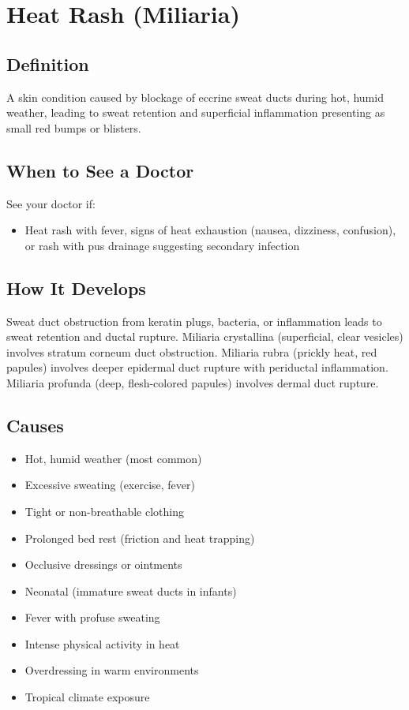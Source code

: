\chapter{Heat Rash (Miliaria)}

\section*{Definition}
A skin condition caused by blockage of eccrine sweat ducts during hot, humid weather, leading to sweat retention and superficial inflammation presenting as small red bumps or blisters.

\section*{When to See a Doctor}
See your doctor if:
\begin{itemize}
  \item Heat rash with fever, signs of heat exhaustion (nausea, dizziness, confusion), or rash with pus drainage suggesting secondary infection
\end{itemize}

\section*{How It Develops}
Sweat duct obstruction from keratin plugs, bacteria, or inflammation leads to sweat retention and ductal rupture. Miliaria crystallina (superficial, clear vesicles) involves stratum corneum duct obstruction. Miliaria rubra (prickly heat, red papules) involves deeper epidermal duct rupture with periductal inflammation. Miliaria profunda (deep, flesh-colored papules) involves dermal duct rupture.

\section*{Causes}
\begin{itemize}
  \item Hot, humid weather (most common)
  \item Excessive sweating (exercise, fever)
  \item Tight or non-breathable clothing
  \item Prolonged bed rest (friction and heat trapping)
  \item Occlusive dressings or ointments
  \item Neonatal (immature sweat ducts in infants)
  \item Fever with profuse sweating
  \item Intense physical activity in heat
  \item Overdressing in warm environments
  \item Tropical climate exposure
\end{itemize}

